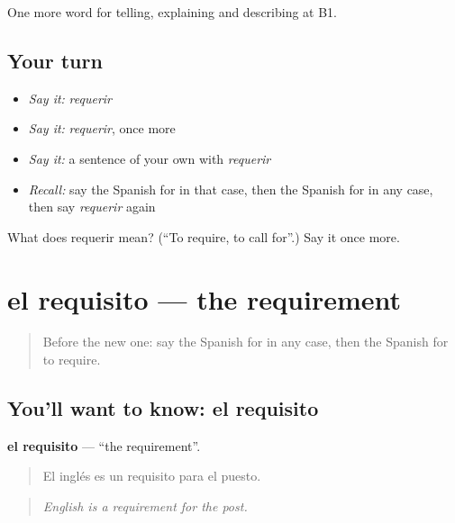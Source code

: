 \begin{grammarlens}[title={What you've built}]
One more word for telling, explaining and describing at B1.
\end{grammarlens}

\subsection*{Your turn}
\begin{itemize}
\raggedright
  \item \emph{Say it:} \emph{requerir}
  \item \emph{Say it:} \emph{requerir}, once more
  \item \emph{Say it:} a sentence of your own with \emph{requerir}
  \item \emph{Recall:} say the Spanish for in that case, then the Spanish for in any case, then say \emph{requerir} again
\end{itemize}

\begin{tcolorbox}[breakable,colback=teal!4,colframe=teal!35!black,title={Before you move on}]
What does requerir mean? (\textquotedblleft{}To require, to call for\textquotedblright{}.) Say it once more.
\end{tcolorbox}
\section[el requisito]{el requisito — the requirement}

\label{lesson:ES-C613-requisito}



\begin{quote}
Before the new one: say the Spanish for in any case, then the Spanish for to require.
\end{quote}

\subsection*{You'll want to know: el requisito}
\textbf{el requisito} — \textquotedblleft{}the requirement\textquotedblright{}.

\begin{quote}
El inglés es un requisito para el puesto.
\end{quote}

\begin{quote}
\emph{English is a requirement for the post.}
\end{quote}

